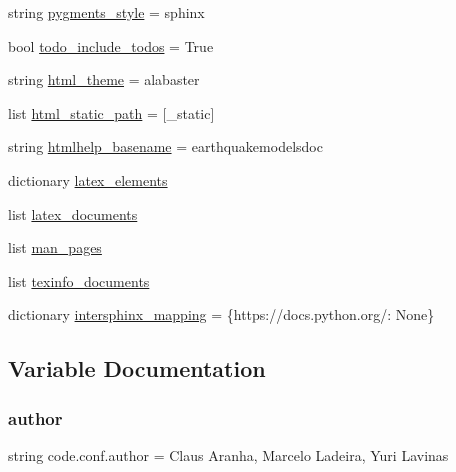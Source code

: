 \begin{DoxyCompactItemize}
\item 
string \hyperlink{namespacecode_1_1conf_a2ee5a64893667d005d3dec8eb590589e}{pygments\+\_\+style} = \textquotesingle{}sphinx\textquotesingle{}
\item 
bool \hyperlink{namespacecode_1_1conf_a596f57833f601e4031318113e26195c9}{todo\+\_\+include\+\_\+todos} = True
\item 
string \hyperlink{namespacecode_1_1conf_adb153618b915f7d9574a585489aa76c2}{html\+\_\+theme} = \textquotesingle{}alabaster\textquotesingle{}
\item 
list \hyperlink{namespacecode_1_1conf_a93c108ad7db4dd2c7ddaf8db952d92c1}{html\+\_\+static\+\_\+path} = \mbox{[}\textquotesingle{}\+\_\+static\textquotesingle{}\mbox{]}
\item 
string \hyperlink{namespacecode_1_1conf_a5685d1e2c0682908076ccbd739d1fca6}{htmlhelp\+\_\+basename} = \textquotesingle{}earthquakemodelsdoc\textquotesingle{}
\item 
dictionary \hyperlink{namespacecode_1_1conf_aa6eee196fd5daecd5ba7048204152341}{latex\+\_\+elements}
\item 
list \hyperlink{namespacecode_1_1conf_ac3b3aace54760e2d1f649228846f441f}{latex\+\_\+documents}
\item 
list \hyperlink{namespacecode_1_1conf_a0df00565ac2afa48150285440c8a7075}{man\+\_\+pages}
\item 
list \hyperlink{namespacecode_1_1conf_a4dc7293e0ef1c9e0a3c9f46b18d06e3c}{texinfo\+\_\+documents}
\item 
dictionary \hyperlink{namespacecode_1_1conf_a55077b6bc082b07d38e9634d4e035828}{intersphinx\+\_\+mapping} = \{\textquotesingle{}https\+://docs.\+python.\+org/\textquotesingle{}\+: None\}
\end{DoxyCompactItemize}


\subsection{Variable Documentation}
\mbox{\label{namespacecode_1_1conf_ad0acbdb5014c1704f8c4c7bf5b95394d}} 
\subsubsection{\texorpdfstring{author}{author}}
{\footnotesize\ttfamily string code.\+conf.\+author = \textquotesingle{}Claus Aranha, Marcelo Ladeira, Yuri Lavinas\textquotesingle{}}

